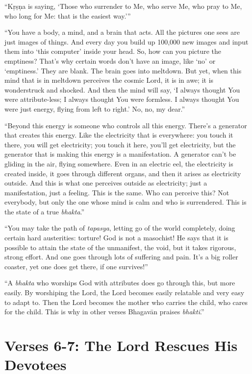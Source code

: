 \enquote{Kṛṣṇa is saying, \enquote{Those who surrender to Me, who serve Me, who pray to Me, who long for Me: that is the easiest way.}}

\enquote{You have a body, a mind, and a brain that acts. All the pictures one sees are just images of things. And every day you build up 100,000 new images and input them into \enquote{this computer} inside your head. So, how can you picture the emptiness? That’s why certain words don’t have an image, like \enquote{no} or \enquote{emptiness.} They are blank. The brain goes into meltdown. But yet, when this mind that is in meltdown perceives the cosmic Lord, it is in awe; it is wonderstruck and shocked. And then the mind will say, \enquote{I always thought You were attribute-less; I always thought You were formless. I always thought You were just energy, flying from left to right.} No, no, my dear.}

\enquote{Beyond this energy is someone who controls all this energy. There’s a generator that creates this energy. Like the electricity that is everywhere: you touch it there, you will get electricity; you touch it here, you’ll get electricity, but the generator that is making this energy is a manifestation. A generator can’t be gliding in the air, flying somewhere. Even in an electric eel, the electricity is created inside, it goes through different organs, and then it arises as electricity outside. And this is what one perceives outside as electricity; just a manifestation, just a feeling. This is the same. Who can perceive this? Not everybody, but only the one whose mind is calm and who is surrendered. This is the state of a true \textit{bhakta}.}

\enquote{You may take the path of \textit{tapasya}, letting go of the world completely, doing certain hard austerities: torture! God is not a masochist! He says that it is possible to attain the state of the unmanifest, the void, but it takes rigorous, strong effort. And one goes through lots of suffering and pain. It’s a big roller coaster, yet one does get there, if one survives!}

\enquote{A \textit{bhakta} who worships God with attributes does go through this, but more easily. By worshiping the Lord, the Lord becomes easily relatable and very easy to adapt to. Then the Lord becomes the mother who carries the child, who cares for the child. This is why in other verses Bhagavān praises \textit{bhakti}.}

\newpage
\section{Verses 6-7: The Lord Rescues His Devotees}\label{sec-verses-6-7-the-lord-rescues-his-devotees}


